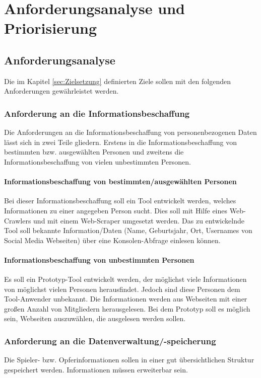 
\chapter{Anforderungsanalyse und Priorisierung}  %
\label{cha:Anforderungsanalyse und Prioriesierung} %
\section{Anforderungsanalyse} %
\label{sec:Anforderunsanalyse} %
Die im Kapitel \ref{sec:Zielsetzung} definierten Ziele sollen mit den folgenden Anforderungen gewährleistet werden.

	\subsection{Anforderung an die Informationsbeschaffung}
	Die Anforderungen an die Informationsbeschaffung von personenbezogenen Daten lässt sich in zwei Teile gliedern. Erstens in die Informationsbeschaffung von bestimmten bzw. ausgewählten Personen und zweitens die Informationsbeschaffung von vielen unbestimmten Personen.
		\subsubsection{Informationsbeschaffung von bestimmten/ausgewählten Personen}
		Bei dieser Informationsbeschaffung soll ein Tool entwickelt werden, welches Informationen zu einer angegeben Person sucht. Dies soll mit Hilfe eines Web-Crawlers und mit einem Web-Scraper umgesetzt werden. Das zu entwickelnde Tool soll bekannte Information/Daten (Name, Geburtsjahr, Ort, Usernames von Social Media Webseiten) über eine Konsolen-Abfrage einlesen können.
	
		\subsubsection{Informationsbeschaffung von unbestimmten Personen}
		Es soll ein Prototyp-Tool entwickelt werden, der möglichst viele Informationen von möglichst vielen Personen herausfindet. Jedoch sind diese Personen dem Tool-Anwender unbekannt. Die Informationen werden aus Webseiten mit einer großen Anzahl von Mitgliedern herausgelesen. Bei dem Prototyp soll es möglich sein, Webseiten auszuwählen, die ausgelesen werden sollen.
	\subsection{Anforderung an die Datenverwaltung/-speicherung}
	Die Spieler- bzw. Opferinformationen sollen in einer gut übersichtlichen Struktur gespeichert werden. Informationen müssen erweiterbar sein.
	
